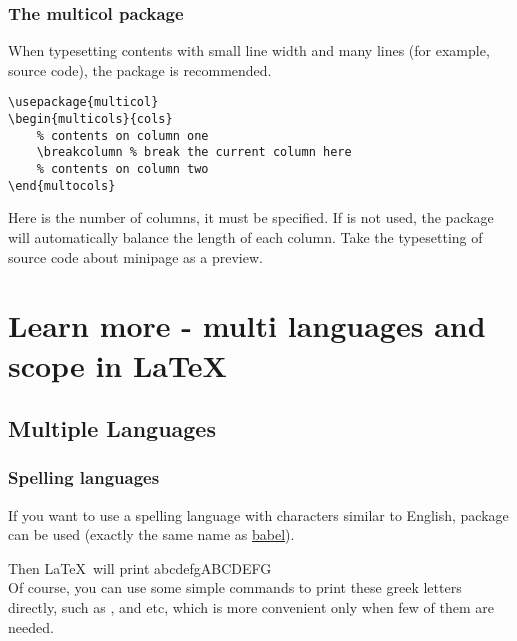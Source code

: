 \begin{frame}[fragile]
	\frametitle{The multicol package}
	When typesetting contents with small line width and many lines (for example, source code), the  package is recommended.
	\begin{command}
		\begin{verbatim}
\usepackage{multicol}
\begin{multicols}{cols}
	% contents on column one
	\breakcolumn % break the current column here
	% contents on column two
\end{multocols}
		\end{verbatim}
	\end{command}
	Here  is the number of columns, it must be specified. If \LC{\breakcolumn} is not used, the  package will automatically balance the length of each column. Take the typesetting of source code about minipage as a preview.
\end{frame}

\section{Learn more - multi languages and scope in \LaTeX}
\begin{frame}
\end{frame}

\subsection{Multiple Languages}

\begin{frame}[fragile]
	\frametitle{Spelling languages}
	If you want to use a spelling language with characters similar to English, package  can be used (exactly the same name as \href{http://babeljs.io/}{babel}).
	Then \LaTeX\ will print \textgreek{abcdefgABCDEFG} \\
	Of course, you can use some simple commands to print these greek letters directly, such as \LC{\alpha}, \LC{\beta} and etc, which is more convenient only when few of them are needed.
\end{frame}

